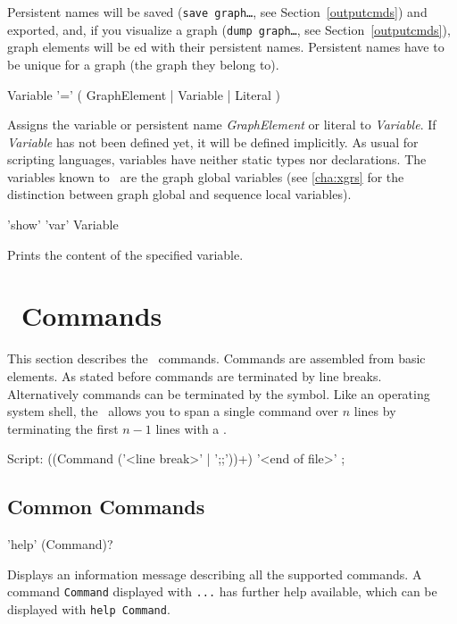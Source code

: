 \begin{note}
Persistent names will be saved (\texttt{save graph\dots}, see Section~\ref{outputcmds}) and exported, 
and, if you visualize a graph (\texttt{dump graph\dots}, see Section~\ref{outputcmds}), 
graph elements will be ed with their persistent names.
Persistent names have to be unique for a graph (the graph they belong to).
\end{note}

\begin{rail}
  Variable '=' ( GraphElement | Variable | Literal )
\end{rail}
Assigns the variable or persistent name \emph{GraphElement} or literal to \emph{Variable}.
If \emph{Variable} has not been defined yet, it will be defined implicitly.
As usual for scripting languages, variables have neither static types nor declarations.
The variables known to \GrShell\ are the graph global variables (see \ref{cha:xgrs} for the distinction between graph global and sequence local variables).

\begin{rail} 
'show' 'var' Variable 
\end{rail}
Prints the content of the specified variable.


\section{\GrShell\ Commands}
This section describes the \GrShell\ commands. Commands are assembled from basic elements. 
As stated before commands are terminated by line breaks. Alternatively commands can be terminated by the \indexed{\texttt{;;}} symbol.
Like an operating system shell, the \GrShell\ allows you to span a single command over $n$ lines by terminating the first $n-1$ lines with a .  
\begin{rail}
  Script: ((Command ('<line break>' | ';;'))+) '<end of file>' ;
\end{rail}


\subsection{Common Commands}
\label{commcommands}
\begin{rail}
  'help' (Command)?
\end{rail}
Displays an information message describing all the supported commands. 
A command \texttt{Command} displayed with \texttt{...} has further help available, which can be displayed with \texttt{help Command}.

